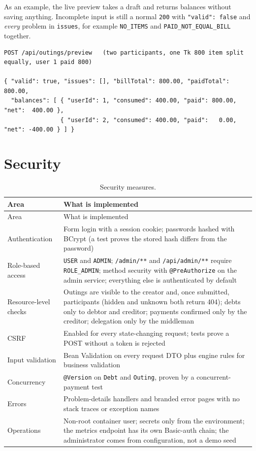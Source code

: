 \documentclass[10pt,a4paper]{article}
\newcommand{\code}[1]{\texttt{#1}}
\begin{document}
As an example, the live preview takes a draft and returns balances without saving anything. Incomplete input is still a
normal \code{200} with \code{"valid": false} and \emph{every} problem in \code{issues}, for example \code{NO\_ITEMS}
and \code{PAID\_NOT\_EQUAL\_BILL} together.

\begin{lstlisting}
POST /api/outings/preview   (two participants, one Tk 800 item split equally, user 1 paid 800)

{ "valid": true, "issues": [], "billTotal": 800.00, "paidTotal": 800.00,
  "balances": [ { "userId": 1, "consumed": 400.00, "paid": 800.00, "net":  400.00 },
                { "userId": 2, "consumed": 400.00, "paid":   0.00, "net": -400.00 } ] }
\end{lstlisting}

\section{Security}

{\small
\begin{longtable}{@{}>{\raggedright\arraybackslash}p{3.3cm}>{\raggedright\arraybackslash}p{12.2cm}@{}}
\caption{Security measures.}\\
\toprule
Area & What is implemented \\
\midrule
\endfirsthead
\toprule
Area & What is implemented \\
\midrule
\endhead
\bottomrule
\endfoot
Authentication & Form login with a session cookie; passwords hashed with BCrypt (a test proves the stored hash differs from the password) \\
Role-based access & \code{USER} and \code{ADMIN}; \code{/admin/**} and \code{/api/admin/**} require \code{ROLE\_ADMIN}; method security with \code{@PreAuthorize} on the admin service; everything else is authenticated by default \\
Resource-level checks & Outings are visible to the creator and, once submitted, participants (hidden and unknown both return 404); debts only to debtor and creditor; payments confirmed only by the creditor; delegation only by the middleman \\
CSRF & Enabled for every state-changing request; tests prove a POST without a token is rejected \\
Input validation & Bean Validation on every request DTO plus engine rules for business validation \\
Concurrency & \code{@Version} on \code{Debt} and \code{Outing}, proven by a concurrent-payment test \\
Errors & Problem-details handlers and branded error pages with no stack traces or exception names \\
Operations & Non-root container user; secrets only from the environment; the metrics endpoint has its own Basic-auth chain; the administrator comes from configuration, not a demo seed \\
\end{longtable}}
\end{document}

